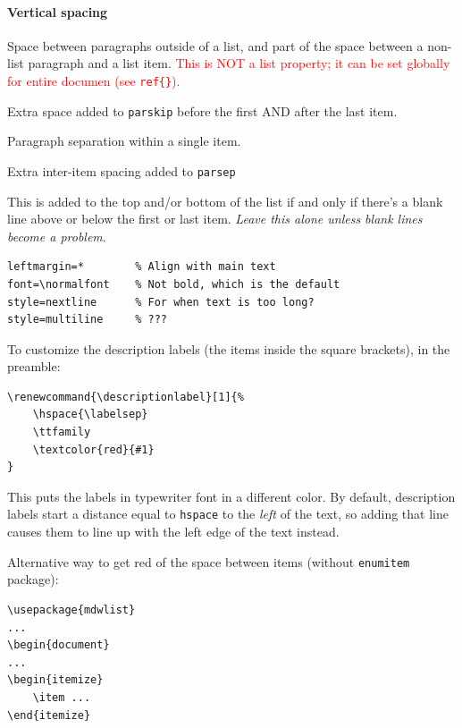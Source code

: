 \documentclass{article}
\renewcommand{\descriptionlabel}[1]{%
    \ttfamily\textcolor{cadet}{#1}
}
\begin{document}
\paragraph{Vertical spacing}
\begin{description}[labelindent=2cm, leftmargin=\labelindent]
    \item [parskip] Space between paragraphs outside of a list, and part of
        the space between a non-list paragraph and a list item.
        \textcolor{red}{This is NOT a list property; it can be set
        globally for entire documen (see \SS{} \texttt{ref\{\}}).}
    \item [topsep] Extra space added to \texttt{parskip} before the first
        AND after the last item.
    \item [parsep] Paragraph separation within a single item.
    \item [itemsep] Extra inter-item spacing added to \texttt{parsep}
    \item [partopsep] This is added to the top and/or bottom of the list
        if and only if there's a blank line above or below the first
        or last item. \emph{Leave this alone unless blank lines become a
        problem}.
\end{description}

\begin{verbatim}
leftmargin=*        % Align with main text
font=\normalfont    % Not bold, which is the default
style=nextline      % For when text is too long?
style=multiline     % ???
\end{verbatim}

To customize the description labels (the items inside the square
brackets), in the preamble:
\begin{verbatim}
\renewcommand{\descriptionlabel}[1]{%
    \hspace{\labelsep}
    \ttfamily
    \textcolor{red}{#1}
}
\end{verbatim}
This puts the labels in typewriter font in a different color.
By default, description labels start a distance equal to
\texttt{hspace} to the \emph{left} of the text, so adding that line
causes them to line up with the left edge of the text instead.

Alternative way to get red of the space between items
(without \texttt{enumitem} package):
\begin{verbatim}
\usepackage{mdwlist}
...
\begin{document}
...
\begin{itemize}
    \item ...
\end{itemize}
\end{verbatim}
\end{document}
